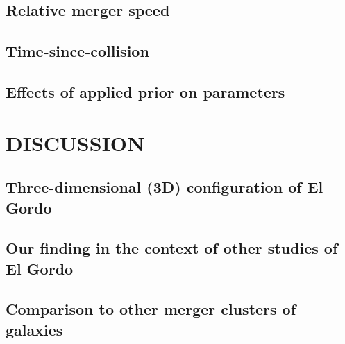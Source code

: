 \subsection{Relative merger speed}


\subsection{Time-since-collision}  



\subsection{Effects of applied prior on parameters}





\section{DISCUSSION}

\subsection{Three-dimensional (3D) configuration of El Gordo}


\subsection{Our finding in the context of other studies of El Gordo}


\subsection{Comparison to other merger clusters of galaxies}


